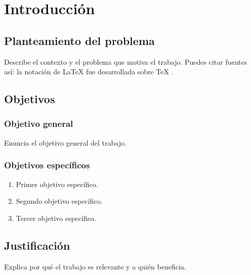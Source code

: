 \chapter{Introducción}
\label{cap:introduccion}

\section{Planteamiento del problema}
Describe el contexto y el problema que motiva el trabajo. Puedes citar fuentes así:
la notación de \LaTeX{} fue desarrollada sobre \TeX{} \cite{knuth1984}.

\section{Objetivos}
\subsection{Objetivo general}
Enuncia el objetivo general del trabajo.

\subsection{Objetivos específicos}
\begin{enumerate}
  \item Primer objetivo específico.
  \item Segundo objetivo específico.
  \item Tercer objetivo específico.
\end{enumerate}

\section{Justificación}
Explica por qué el trabajo es relevante y a quién beneficia.
